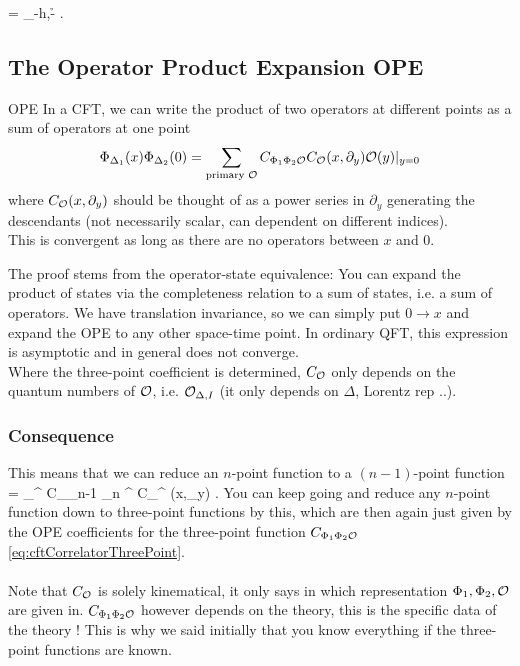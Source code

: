  \be 
 \ket{\phi} = \phi_{-h,-\h} .
 \ee 
 
 
 
 
 
 
 
 
 
 
 
 
 
  \subsection{The Operator Product Expansion OPE}
  \begin{mybox}{OPE}
  	In a CFT, we can write the product of two operators at different points as a sum of operators at one point
 \begin{equation}
 \label{eq:cftOPE}
 \Phi_{\Delta_1}(x) \Phi_{\Delta_2}(0) = \sum_{\text{primary } \mathcal{O}} C_{\Phi_1 \Phi_2 \mathcal{O}} C_{\mathcal{O}}(x,\partial_y) \mathcal{O}(y) |_{y=0} 
 \end{equation}
 where $C_{\mathcal{O}}(x,\partial_y)$ should be thought of as a power series in $\partial_y$ generating the descendants (not necessarily scalar, can dependent on different indices).\\
 This is convergent as long as there are no operators between $x$ and $0$.
 \end{mybox}
The proof stems from the operator-state equivalence: You can expand the product of states via the completeness relation to a sum of states, i.e. a sum of operators. We have translation invariance, so we can simply put $0 \rightarrow x$ and expand the OPE to any other space-time point. In ordinary QFT, this expression is asymptotic and in general does not converge.\\
Where the three-point coefficient is determined, $C_{\mathcal{O}}$ only depends on the quantum numbers of $\mathcal{O}$, i.e. $\mathcal{O}_{\Delta,I}$ (it only depends on $\Delta$, Lorentz rep ..).\\

\subsubsection{Consequence}
This means that we can reduce an $n$-point function to a $(n-1)$-point function
\bse 
{} = \sum_{\mO^\prime} C_{\mO_{n-1} \mO_n \mO^\prime} C_{\mO^\prime} (x,\partial_y) .
\ese 
You can keep going and reduce any $n$-point function down to three-point functions by this, which are then again just given by the OPE coefficients for the three-point function $C_{\Phi_1 \Phi_2 \mathcal{O}}$ \ref{eq:cftCorrelatorThreePoint}.\\
\\
Note that $C_{\mathcal{O}}$ is solely kinematical, it only says in which representation $\Phi_1,\Phi_2,\mathcal{O}$ are given in. $C_{\Phi_1\Phi_2 \mathcal{O}}$ however depends on the theory, this is the specific data of the theory ! This is why we said initially that you know everything if the three-point functions are known.

